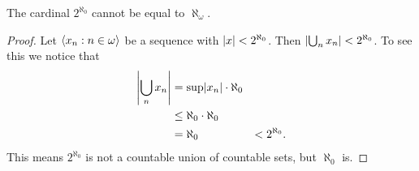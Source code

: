 \begin{proposition}
    The cardinal \(2^{\aleph_{0}}\) cannot be equal to \(\aleph_{\omega}\).

    \begin{proof}
        Let \(\sequence{x_{n}}{n\in\omega}\) be a sequence with
        \(\abs{x}<2^{\aleph_{0}}\). Then
        \(\abs{\bigcup_{n}x_{n}}<2^{\aleph_{0}}\). To see this we notice that
        \begin{align*}
            \abs*{\bigcup_{n}x_{n}} & =\sup\abs{x_{n}}\cdot\aleph_{0} \\
                                    & \leq\aleph_{0}\cdot\aleph_{0}   \\
                                    & =\aleph_{0}
                                    & <2^{\aleph_{0}}.
        \end{align*}
        This means \(2^{\aleph_{0}}\) is not a countable union of countable
        sets, but \(\aleph_{0}\) is.
    \end{proof}
\end{proposition}